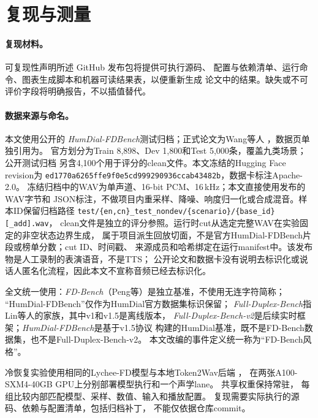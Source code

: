 
\clearpage
\appendix

\section{复现与测量}
\label{app:protocol}

\paragraph{复现材料。} 可复现性声明所述 GitHub 发布包将提供可执行源码、
配置与依赖清单、运行命令、图表生成脚本和机器可读结果表，以便重新生成
论文中的结果。缺失或不可评价字段将明确报告，不以插值替代。

\paragraph{数据来源与命名。} 本文使用公开的
\emph{HumDial-FDBench}测试归档；正式论文为Wang等人
\citep{humdial2026}，数据页单独引用为\citep{humdialdataset2026}。
官方划分为Train 8,898、Dev 1,800和Test 5,000条，覆盖九类场景；公开测试归档
另含4,100个用于评分的clean文件。本文冻结的Hugging Face revision为
\texttt{ed1770a6265ffe9f0e5cd999290936ccab43482b}，数据卡标注Apache-2.0。
冻结归档中的WAV为单声道、16-bit PCM、16\,kHz；本文直接使用发布的WAV字节和
JSON标注，不做项目内重采样、降噪、响度归一化或合成混音。样本ID保留归档路径
\texttt{test/\{en,cn\}\_test\_nondev/\{scenario\}/\{base\_id\}[\_add].wav}，
clean文件是独立的评分参照。运行时cut从选定完整WAV在实验固定的非空状态边界生成，
属于项目派生回放切面，不是官方HumDial-FDBench片段或榜单分数；cut ID、时间戳、
来源成员和哈希绑定在运行manifest中。该发布物是人工录制的表演语音，不是TTS；
公开论文和数据卡没有说明去标识化或说话人匿名化流程，因此本文不宣称音频已经去标识化。

全文统一使用：\emph{FD-Bench}（Peng等）是独立基准，不使用无连字符简称；
“HumDial-FDBench”仅作为HumDial官方数据集标识保留；
\emph{Full-Duplex-Bench}指Lin等人的家族，其中v1和v1.5是离线版本，
\emph{Full-Duplex-Bench-v2}是后续实时框架；\emph{HumDial-FDBench}是基于v1.5协议
构建的HumDial基准，既不是FD-Bench数据集，也不是Full-Duplex-Bench-v2。
本文改编的事件定义统一称为“FD-Bench风格”。


冷恢复实验使用相同的Lychee-FD模型与本地Token2Wav后端
\citep{lychee2026}，
在两张A100-SXM4-40GB GPU上分别部署模型执行和一个声学lane。
共享权重保持常驻，
每组比较内部匹配模型、采样、数值、输入和播放配置。
复现需要实际执行的源码、依赖与配置清单，包括归档补丁，
不能仅依据仓库commit。

